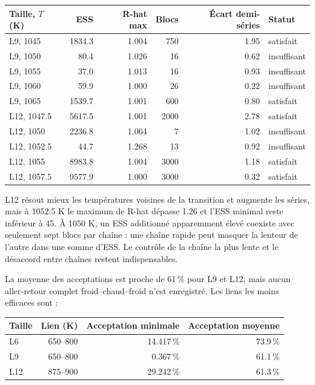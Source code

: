 \begin{center}\small\begin{tabular}{lrrrrl}\toprule

Taille, $T$ (K) & ESS & R-hat max & Blocs & Écart demi-séries & Statut\\\midrule

L9, 1045 & 1834.3 & 1.004 & 750 & 1.95 & satisfait\\

L9, 1050 & 80.4 & 1.026 & 16 & 0.62 & insuffisant\\

L9, 1055 & 37.0 & 1.013 & 16 & 0.93 & insuffisant\\

L9, 1060 & 59.9 & 1.000 & 26 & 0.22 & insuffisant\\

L9, 1065 & 1539.7 & 1.001 & 600 & 0.80 & satisfait\\

L12, 1047.5 & 5617.5 & 1.001 & 2000 & 2.78 & satisfait\\

L12, 1050 & 2236.8 & 1.064 & 7 & 1.02 & insuffisant\\

L12, 1052.5 & 44.7 & 1.268 & 13 & 0.92 & insuffisant\\

L12, 1055 & 8983.8 & 1.004 & 3000 & 1.18 & satisfait\\

L12, 1057.5 & 9577.9 & 1.000 & 3000 & 0.32 & satisfait\\

\bottomrule\end{tabular}\end{center}

L12 résout mieux les températures voisines de la transition et augmente les séries, mais à 1052.5 K le maximum de R-hat dépasse 1.26 et l’ESS minimal reste inférieur à 45. À 1050 K, un ESS additionné apparemment élevé coexiste avec seulement sept blocs par chaîne : une chaîne rapide peut masquer la lenteur de l’autre dans une somme d’ESS. Le contrôle de la chaîne la plus lente et le désaccord entre chaînes restent indispensables.

La moyenne des acceptations est proche de 61\,\% pour L9 et L12, mais aucun aller-retour complet froid--chaud--froid n’est enregistré. Les liens les moins efficaces sont :

\begin{center}\small\begin{tabular}{lrrr}\toprule

Taille & Lien (K) & Acceptation minimale & Acceptation moyenne\\\midrule

L6 & 650--800 & 14.417\,\% & 73.9\,\%\\

L9 & 650--800 & 0.367\,\% & 61.1\,\%\\

L12 & 875--900 & 29.242\,\% & 61.3\,\%\\

\bottomrule\end{tabular}\end{center}

